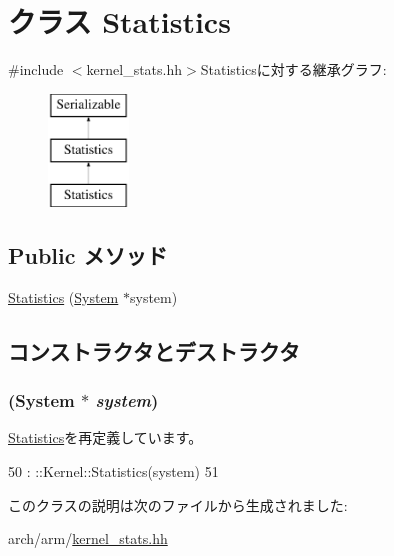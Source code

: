 \hypertarget{classArmISA_1_1Kernel_1_1Statistics}{
\section{クラス Statistics}
\label{classArmISA_1_1Kernel_1_1Statistics}
}


{\ttfamily \#include $<$kernel\_\-stats.hh$>$}Statisticsに対する継承グラフ:\begin{figure}[H]
\begin{center}
\leavevmode
\includegraphics[height=3cm]{classArmISA_1_1Kernel_1_1Statistics}
\end{center}
\end{figure}
\subsection*{Public メソッド}
\begin{DoxyCompactItemize}
\item 
\hyperlink{classArmISA_1_1Kernel_1_1Statistics_a83aac6d65afe578fbf92b926ce7c1c3c}{Statistics} (\hyperlink{classSystem}{System} $\ast$system)
\end{DoxyCompactItemize}


\subsection{コンストラクタとデストラクタ}
\hypertarget{classArmISA_1_1Kernel_1_1Statistics_a83aac6d65afe578fbf92b926ce7c1c3c}{
\subsubsection[{Statistics}]{ ({\bf System} $\ast$ {\em system})}}
\label{classArmISA_1_1Kernel_1_1Statistics_a83aac6d65afe578fbf92b926ce7c1c3c}


\hyperlink{classKernel_1_1Statistics_a83aac6d65afe578fbf92b926ce7c1c3c}{Statistics}を再定義しています。


\begin{DoxyCode}
50                                : ::Kernel::Statistics(system)
51     {}
\end{DoxyCode}


このクラスの説明は次のファイルから生成されました:\begin{DoxyCompactItemize}
\item 
arch/arm/\hyperlink{arch_2arm_2kernel__stats_8hh}{kernel\_\-stats.hh}\end{DoxyCompactItemize}
